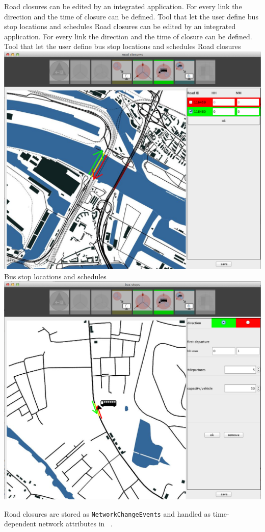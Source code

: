 \createfigure%
{Road closures can be edited by an integrated  application. For every link the direction and the time of closure can be defined. Tool that let the user define bus stop locations and schedules}%
{Road closures can be edited by an integrated  application. For every link the direction and the time of closure can be defined. Tool that let the user define bus stop locations and schedules}%
{\label{fig:evac_editor}}%
{%
  \createsubfigure%
  {Road closures}%
{\includegraphics[width=.475\linewidth]{extending/figures/Evacuation/rd_closure_detail}}
  {}%
  {}%
  \createsubfigure%
  {Bus stop locations and schedules}%
{\includegraphics[width=.475\linewidth]{extending/figures/Evacuation/bus_stops}}
  {}%
  {}%
}%
  {}%

Road closures are stored as \lstinline|NetworkChangeEvents| and handled as time-dependent network attributes in ~\citep{LaemmelEtAl_TransResC_2010}.

